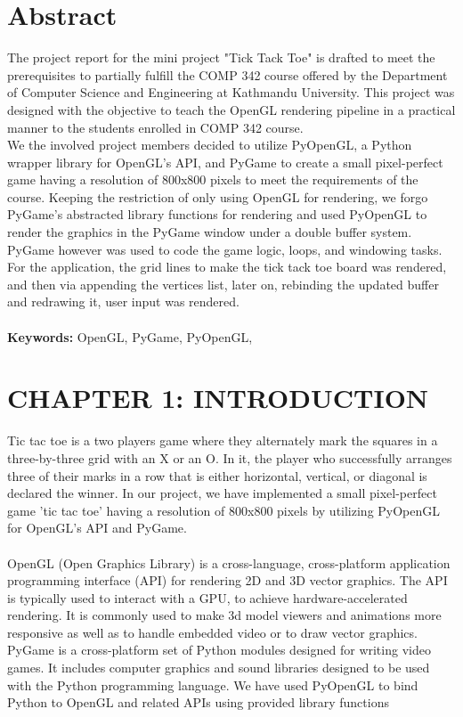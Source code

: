 \documentclass[12pt]{article}
\begin{document}
\section*{Abstract}
The project report for the mini project "Tick Tack Toe" is drafted to meet the prerequisites to partially fulfill
the COMP 342 course offered by the Department of Computer Science and Engineering at Kathmandu University.
This project was designed with the objective to teach the OpenGL rendering pipeline in a practical manner to the students enrolled in
COMP 342 course.\\
We the involved project members decided to utilize PyOpenGL, a Python wrapper library for OpenGL's API, and PyGame to create a small pixel-perfect game having a resolution of 800x800 pixels
to meet the requirements of the course. Keeping the restriction of only using OpenGL for rendering, we forgo PyGame's abstracted library functions
for rendering and used PyOpenGL to render the graphics in the PyGame window under a double buffer system.
PyGame however was used to code the game logic, loops, and windowing tasks.\\
For the application, the grid lines to make the tick tack toe board was rendered, and then via appending the vertices list, later on, rebinding the updated buffer and redrawing it, user input was rendered.
\\\\
\textbf{Keywords: }OpenGL, PyGame, PyOpenGL,

\clearpage
\thispagestyle{empty}
\tableofcontents

\clearpage
\thispagestyle{empty}
\listoffigures

\clearpage
{}
\section{CHAPTER 1: INTRODUCTION}
Tic tac toe is a two players game where they alternately mark the squares in a three-by-three grid with an X or an O.
In it, the player who successfully arranges three of their marks in a row that is either horizontal, vertical, or diagonal
is declared the winner. In our project, we have implemented a small pixel-perfect game 'tic tac toe' having a resolution of
800x800 pixels by utilizing PyOpenGL for OpenGL’s API and PyGame. \\\\
OpenGL (Open Graphics Library) is a cross-language, cross-platform application programming interface (API) for rendering 2D
and 3D vector graphics. The API is typically used to interact with a GPU, to achieve hardware-accelerated rendering. It is
commonly used to make 3d model viewers and animations more responsive as well as to handle embedded video or to draw vector graphics.
PyGame is a cross-platform set of Python modules designed for writing video games. It includes computer graphics and sound libraries
designed to be used with the Python programming language.
We have used PyOpenGL to bind Python to OpenGL and related APIs using provided library functions
\end{document}
